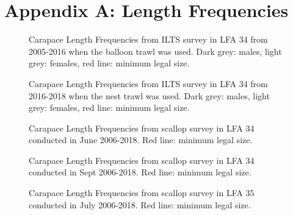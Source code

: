 \documentclass[11pt]{article}
\newcommand{\e}{/SpinDr/backup/bio_data/bio.lobster/figures/LFA3438Framework2019/} %
\begin{document}
\appendix
\renewcommand\thefigure{\thesection.\arabic{figure}}    
\section{Appendix A: Length Frequencies}
\setcounter{figure}{0}    


    \begin{figure}
    \centering
        \caption{Carapace Length Frequencies from ILTS survey in LFA 34 from 2005-2016 when the balloon trawl was used. Dark grey: males, light grey: females, red line: minimum legal size.}

    \end{figure}


    \begin{figure}
    \centering
        \caption{Carapace Length Frequencies from ILTS survey in LFA 34 from 2016-2018 when the nest trawl was used. Dark grey: males, light grey: females, red line: minimum legal size.}

    \end{figure}


   \begin{figure}
   \centering
       \caption{Carapace Length Frequencies from scallop survey in LFA 34 conducted in June 2006-2018. Red line: minimum legal size.}
   \end{figure}
   \begin{figure}
   \centering
       \caption{Carapace Length Frequencies from scallop survey in LFA 34 conducted in Sept 2006-2018. Red line: minimum legal size.}
   \end{figure}



    \begin{figure}
    \centering
        \caption{Carapace Length Frequencies from scallop survey in LFA 35 conducted in July 2006-2018. Red line: minimum legal size.}

    \end{figure}
\end{document}
